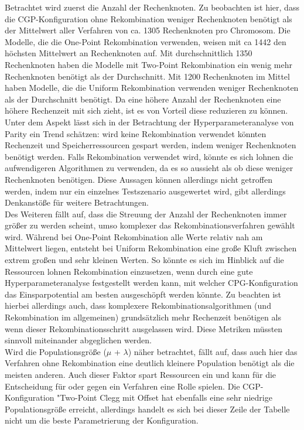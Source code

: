 Betrachtet wird zuerst die Anzahl der Rechenknoten. 
Zu beobachten ist hier, dass die CGP-Konfiguration ohne Rekombination weniger Rechenknoten benötigt als der Mittelwert aller Verfahren von ca. 1305 Rechenknoten pro Chromosom.
Die Modelle, die die One-Point Rekombination verwenden, weisen mit ca 1442 den höchsten Mittelwert an Rechenknoten auf.
Mit durchschnittlich 1350 Rechenknoten haben die Modelle mit Two-Point Rekombination ein wenig mehr Rechenknoten benötigt als der Durchschnitt.
Mit 1200 Rechenknoten im Mittel haben Modelle, die die Uniform Rekombination verwenden weniger Rechenknoten als der Durchschnitt benötigt.
Da eine höhere Anzahl der Rechenknoten eine höhere Rechenzeit mit sich zieht, ist es von Vorteil diese reduzieren zu können.
Unter dem Aspekt lässt sich in der Betrachtung der Hyperparameteranalyse von Parity ein Trend schätzen: wird keine Rekombination verwendet könnten Rechenzeit und Speicherressourcen gespart werden, indem weniger Rechenknoten benötigt werden. 
Falls Rekombination verwendet wird, könnte es sich lohnen die aufwendigeren Algorithmen zu verwenden, da es so aussieht als ob diese weniger Rechenknoten benötigen.
Diese Aussagen können allerdings nicht getroffen werden, indem nur ein einzelnes Testszenario ausgewertet wird, gibt allerdings Denkanstöße für weitere Betrachtungen.\\
Des Weiteren fällt auf, dass die Streuung der Anzahl der Rechenknoten immer größer zu werden scheint, umso komplexer das Rekombinationsverfahren gewählt wird. 
Während bei One-Point Rekombination alle Werte relativ nah am Mittelwert liegen, entsteht bei Uniform Rekombination eine große Kluft zwischen extrem großen und sehr kleinen Werten. 
So könnte es sich im Hinblick auf die Ressourcen lohnen Rekombination einzusetzen, wenn durch eine gute Hyperparameteranalyse festgestellt werden kann, mit welcher CPG-Konfiguration das Einsparpotential am besten ausgeschöpft werden könnte.
Zu beachten ist hierbei allerdings auch, dass komplexere Rekombinationsalgorithmen (und Rekombination im allgemeinen) grundsätzlich mehr Rechenzeit benötigen als wenn dieser Rekombinationsschritt ausgelassen wird.
Diese Metriken müssten sinnvoll miteinander abgeglichen werden.\\
Wird die Populationsgröße ($\mu$ + $\lambda$) näher betrachtet, fällt auf, dass auch hier das Verfahren ohne Rekombination eine deutlich kleinere Population benötigt als die meisten anderen.
Auch dieser Faktor spart Ressourcen ein und kann für die Entscheidung für oder gegen ein Verfahren eine Rolle spielen.
Die CGP-Konfiguration "Two-Point Clegg mit Offset hat ebenfalls eine sehr niedrige Populationsgröße erreicht, allerdings handelt es sich bei dieser Zeile der Tabelle nicht um die beste Parametrierung der Konfiguration.
